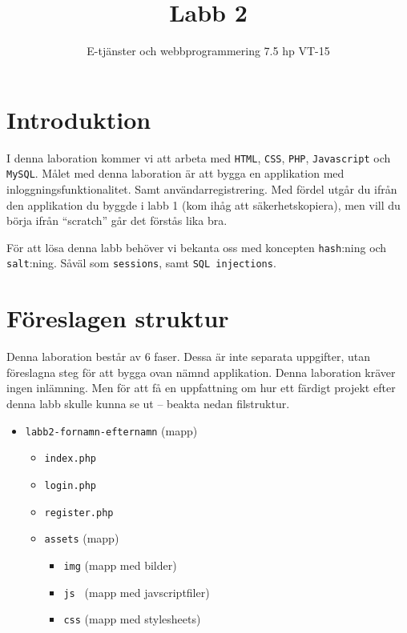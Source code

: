 \documentclass[12pt]{article}
\date{}
\title{ Labb 2 }
\author{ E-tjänster och webbprogrammering 7.5 hp VT-15 }
\begin{document}
\maketitle
\vspace{-2em}



\section{Introduktion}
I denna laboration kommer vi att arbeta med \texttt{HTML}, \texttt{CSS}, \texttt{PHP}, \texttt{Javascript} och \texttt{MySQL}. Målet med denna laboration är att bygga en applikation med inloggningsfunktionalitet. Samt användarregistrering. Med fördel utgår du ifrån den applikation du byggde i labb 1 (kom ihåg att säkerhetskopiera), men vill du börja ifrån ``scratch'' går det förstås lika bra.

För att lösa denna labb behöver vi bekanta oss med koncepten \texttt{hash}:ning och \texttt{salt}:ning. Såväl som \texttt{sessions}, samt \texttt{SQL injections}.



\section{Föreslagen struktur}
Denna laboration består av 6 faser. Dessa är inte separata uppgifter, utan föreslagna steg för att bygga ovan nämnd applikation. Denna laboration kräver ingen inlämning. Men för att få en uppfattning om hur ett färdigt projekt efter denna labb skulle kunna se ut -- beakta nedan filstruktur.
  \begin{itemize}
    \item \texttt{labb2-fornamn-efternamn} (mapp)
      \begin{itemize}
        \item \texttt{index.php}
        \item \texttt{login.php}
        \item \texttt{register.php}
        \item \texttt{assets} (mapp)
      \begin{itemize}
        \item \texttt{img} (mapp med bilder)
        \item \texttt{js } (mapp med javscriptfiler)
	      \item \texttt{css} (mapp med stylesheets)
      \end{itemize}
    \end{itemize}
  \end{itemize}
\end{document}
